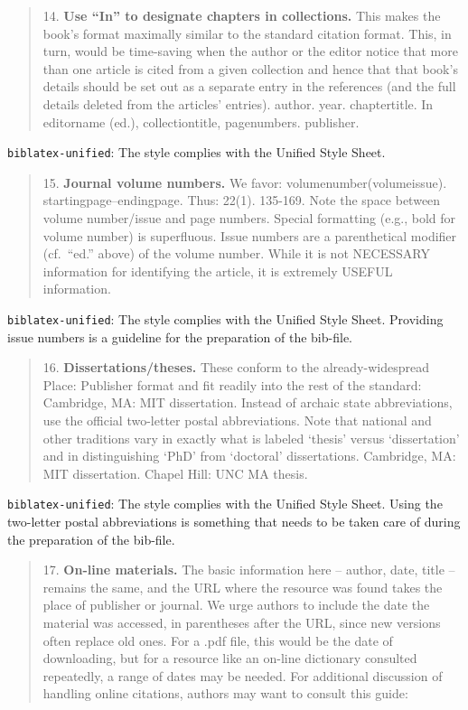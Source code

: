 \documentclass[
]{article}
\begin{document}
\begin{quote}
14. \textbf{Use ``In'' to designate chapters in collections.} This makes
the book's format maximally similar to the standard citation format.
This, in turn, would be time-saving when the author or the editor notice
that more than one article is cited from a given collection and hence
that that book's details should be set out as a separate entry in the
references (and the full details deleted from the articles' entries).
author. year. chaptertitle. In editorname (ed.), collectiontitle,
pagenumbers. publisher.
\end{quote}

\texttt{biblatex-unified}: The style complies with the Unified Style
Sheet.

\begin{quote}
15. \textbf{Journal volume numbers.} We favor:
volumenumber(volumeissue). startingpage--endingpage. Thus: 22(1).
135-169. Note the space between volume number/issue and page numbers.
Special formatting (e.g., bold for volume number) is superfluous. Issue
numbers are a parenthetical modifier (cf.~``ed.'' above) of the volume
number. While it is not NECESSARY information for identifying the
article, it is extremely USEFUL information.
\end{quote}

\texttt{biblatex-unified}: The style complies with the Unified Style
Sheet. Providing issue numbers is a guideline for the preparation of the
bib-file.

\begin{quote}
16. \textbf{Dissertations/theses.} These conform to the
already-widespread Place: Publisher format and fit readily into the rest
of the standard: Cambridge, MA: MIT dissertation. Instead of archaic
state abbreviations, use the official two-letter postal abbreviations.
Note that national and other traditions vary in exactly what is labeled
`thesis' versus `dissertation' and in distinguishing `PhD' from
`doctoral' dissertations. Cambridge, MA: MIT dissertation. Chapel Hill:
UNC MA thesis.
\end{quote}

\texttt{biblatex-unified}: The style complies with the Unified Style
Sheet. Using the two-letter postal abbreviations is something that needs
to be taken care of during the preparation of the bib-file.

\begin{quote}
17. \textbf{On-line materials.} The basic information here -- author,
date, title -- remains the same, and the URL where the resource was
found takes the place of publisher or journal. We urge authors to
include the date the material was accessed, in parentheses after the
URL, since new versions often replace old ones. For a .pdf file, this
would be the date of downloading, but for a resource like an on-line
dictionary consulted repeatedly, a range of dates may be needed. For
additional discussion of handling online citations, authors may want to
consult this guide:
\end{quote}
\end{document}
